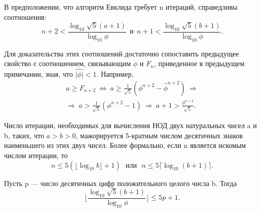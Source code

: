 \documentclass{mai_book}
\begin{document}
\begin{property}
\hspace*{0.5cm}В предположении, что алгоритм Евклида требует n итераций,  
справедливы соотношения: 
\begin{equation*}
n+2 < \frac{\log_{10}{\sqrt{5}(a+1)}}{\log_{10}{\phi}}\:\: \text{и} \:\: n+1 < \frac{\log_{10}{\sqrt{5}(b+1)}}{\log_{10}{\phi}}.
\end{equation*}
\end{property}

\begin{myproof}
Для доказательства этих соотношений достаточно сопоставить 
предыдущее свойство с соотношением, связывающим $\phi$ и $F_n$,  
приведенное в предыдущем примечании, зная, что $\hat{|\phi|} < 1$. Например, 
\begin{multline}
a \geq F_{n+2}\: \Leftrightarrow \: a \geq \frac{1}{\sqrt{5}}(\phi^{n+2} - \hat{\phi}^{n+2}) \: \Rightarrow \\
\Rightarrow \: a > \frac{1}{\sqrt{5}}(\phi^{n+2} - 1) \: \Rightarrow \: a+1 > \frac{\phi^{n+2}}{\sqrt{5}}.
\end{multline}
\end{myproof}

\begin{thm}[Ламе]
\hspace*{0.5cm}Число итерации, необходимых для вычисления $\text{НОД}$ двух  
натуральных чисел a и b, таких, что $a > b > 0$, мажорируется 5-кратным числом 
десятичных знаков наименьшего из этих двух чисел. Более формально, 
если n является искомым числом итерации, то
\begin{equation*}
n \leq 5(\lfloor \log_{10}{b} \rfloor + 1)\:\:\: \textit{или}\:\:\: n \leq 5 \lceil \log_{10}{(b+1)}\rceil.
\end{equation*}
\end{thm}

\begin{lemma}
\hspace*{0.5cm}Пусть p — число десятичных цифр положительного целого числа b. 
Тогда 
\begin{equation*}
\lfloor \frac{\log_{10}{\sqrt{5}(b+1)}}{\log_{10}{\phi}} \rfloor \leq 5p + 1.
\end{equation*}
\end{lemma}
\newpage
\end{document}

